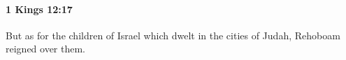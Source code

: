 
		\paragraph{1 Kings 12:17} %
			\label{1KINGS-12-17}

			But as for the children of Israel which dwelt in the cities of Judah, Rehoboam reigned over them.


